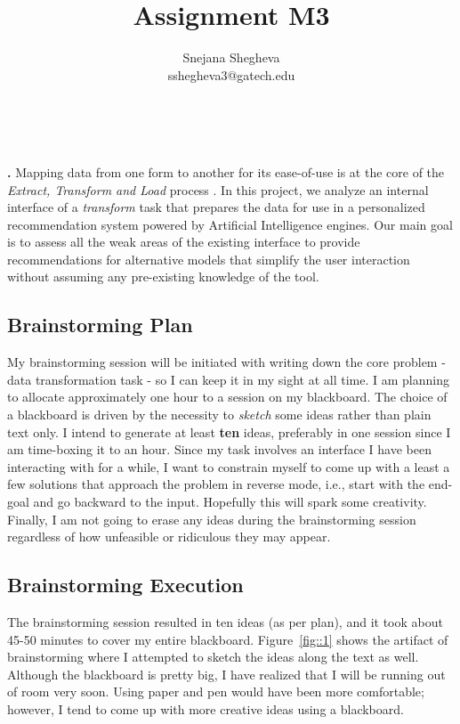 \documentclass[12pt,letterpaper]{article}
\makeatletter
\renewcommand{\maketitle}{\bgroup
   \begin{center}
   \textbf{{\fontsize{18pt}{20}\selectfont \@title}}\\
   \vspace{10pt}
   {\fontsize{12pt}{0}\selectfont \@author} 
   \end{center}
}
\newenvironment{myquote}[1]%
  {\list{}{\leftmargin=#1\rightmargin=#1}\item[]}%
  {\endlist}
\renewenvironment{abstract}
{\vspace*{-.5in}\fontsize{12pt}{12}\begin{myquote}{.5in}
\noindent \par{\bfseries \abstractname.}}
{\medskip\noindent
\end{myquote}
}
\makeatother
\begin{document}
\title{Assignment M3}
\author{Snejana Shegheva \\ sshegheva3@gatech.edu}

\maketitle
\thispagestyle{fancy}

\begin{abstract}
Mapping data from one form to another for its ease-of-use is at the core of the \textit{Extract, Transform and Load} process \cite{wiki:etl}. In this project, we analyze an internal interface of a \textit{transform} task that prepares the data for use in a personalized recommendation system powered by Artificial Intelligence engines. Our main goal is to assess all the weak areas of the existing interface to provide recommendations for alternative models that simplify the user interaction without assuming any pre-existing knowledge of the tool.
\end{abstract}

\subsection*{Brainstorming Plan}
My brainstorming session will be initiated with writing down the core problem - data transformation task - so I can keep it in my sight at all time. I am planning to allocate approximately one hour to a session on my blackboard. The choice of a blackboard is driven by the necessity to \textit{sketch} some ideas rather than plain text only. I intend to generate at least \textbf{ten} ideas, preferably in one session since I am time-boxing it to an hour. Since my task involves an interface I have been interacting with for a while, I want to constrain myself to come up with a least a few solutions that approach the problem in reverse mode, i.e., start with the end-goal and go backward to the input. Hopefully this will spark some creativity. Finally, I am not going to erase any ideas during the brainstorming session regardless of how unfeasible or ridiculous they may appear. 

\subsection*{Brainstorming Execution}
The brainstorming session resulted in ten ideas (as per plan), and it took about 45-50 minutes to cover my entire blackboard. Figure~\ref{fig::1} shows the artifact of brainstorming where I attempted to sketch the ideas along the text as well. Although the blackboard is pretty big, I have realized that I will be running out of room very soon. Using paper and pen would have been more comfortable; however, I tend to come up with more creative ideas using a blackboard.
\end{document}
